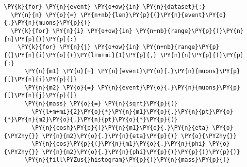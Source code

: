 \begin{Verbatim}[commandchars=\\\{\}]
\PY{k}{for} \PY{n}{event} \PY{o+ow}{in} \PY{n}{dataset}{:}
  \PY{n}{n} \PY{o}{=} \PY{n+nb}{len}\PY{p}{(}\PY{n}{event}\PY{o}{.}\PY{n}{muons}\PY{p}{)}
  \PY{k}{for} \PY{n}{i} \PY{o+ow}{in} \PY{n+nb}{range}\PY{p}{(}\PY{n}{n}\PY{p}{)}\PY{p}{:}
    \PY{k}{for} \PY{n}{j} \PY{o+ow}{in} \PY{n+nb}{range}\PY{p}{(}\PY{n}{i}\PY{o}{+}\PY{l+m+mi}{1}\PY{p}{,} \PY{n}{n}\PY{p}{)}\PY{p}{:}
      \PY{n}{m1} \PY{o}{=} \PY{n}{event}\PY{o}{.}\PY{n}{muons}\PY{p}{[}\PY{n}{i}\PY{p}{]}
      \PY{n}{m2} \PY{o}{=} \PY{n}{event}\PY{o}{.}\PY{n}{muons}\PY{p}{[}\PY{n}{j}\PY{p}{]}
      \PY{n}{mass} \PY{o}{=} \PY{n}{sqrt}\PY{p}{(}
        \PY{l+m+mi}{2}\PY{o}{*}\PY{n}{m1}\PY{o}{.}\PY{n}{pt}\PY{o}{*}\PY{n}{m2}\PY{o}{.}\PY{n}{pt}\PY{o}{*}\PY{p}{(}
        \PY{n}{cosh}\PY{p}{(}\PY{n}{m1}\PY{o}{.}\PY{n}{eta} \PY{o}{\PYZhy{}} \PY{n}{m2}\PY{o}{.}\PY{n}{eta}\PY{p}{)} \PY{o}{\PYZhy{}}
        \PY{n}{cos}\PY{p}{(}\PY{n}{m1}\PY{o}{.}\PY{n}{phi} \PY{o}{\PYZhy{}} \PY{n}{m2}\PY{o}{.}\PY{n}{phi}\PY{p}{)}\PY{p}{)}\PY{p}{)}
      \PY{n}{fill\PYZus{}histogram}\PY{p}{(}\PY{n}{mass}\PY{p}{)}
\end{Verbatim}
